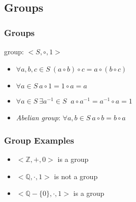 \documentclass[dvipsnames]{beamer}
\begin{document}
\subsection{Groups}

\begin{frame}
  \frametitle{Groups}

  \begin{definition}
    \alert{group}: $<S,\circ,1>$

    \begin{itemize}
      \item $\forall a,b,c \in S~(a \circ b) \circ c = a \circ (b \circ c)$
      \item $\forall a \in S~a \circ 1 = 1 \circ a = a$
      \item $\forall a \in S~\exists a^{-1} \in S~$
        $a \circ a^{-1} = a^{-1} \circ a = 1$

      \pause
      \medskip
      \item \emph{Abelian group}: $\forall a,b \in S~a \circ b = b \circ a$
    \end{itemize}
  \end{definition}
\end{frame}

\begin{frame}
  \frametitle{Group Examples}

  \begin{example}
    \begin{itemize}
      \item $<\mathbb{Z},+,0>$ is a group

      \pause
      \medskip
      \item $<\mathbb{Q},\cdot,1>$ is not a group
      \item $<\mathbb{Q}-\{0\},\cdot,1>$ is a group
    \end{itemize}
  \end{example}
\end{frame}
\end{document}
